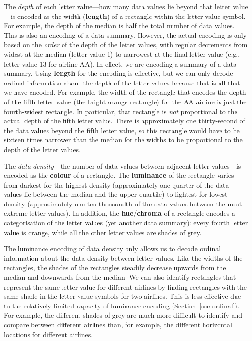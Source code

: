 \documentclass[
  letterpaper,
  DIV=11,
  numbers=noendperiod]{scrreprt}
\begin{document}
The \emph{depth} of each letter value---how many data values lie beyond
that letter value---is encoded as the width (\textbf{length}) of a
rectangle within the letter-value symbol. For example, the depth of the
median is half the total number of data values. This is also an encoding
of a data summary. However, the actual encoding is only based on the
\emph{order} of the depth of the letter values, with regular decrements
from widest at the median (letter value 1) to narrowest at the final
letter value (e.g., letter value 13 for airline AA). In effect, we are
encoding a summary of a data summary. Using \textbf{length} for the
encoding is effective, but we can only decode ordinal information about
the depth of the letter values because that is all that we have encoded.
For example, the width of the rectangle that encodes the depth of the
fifth letter value (the bright orange rectangle) for the AA airline is
just the fourth-widest rectangle. In particular, that rectangle is
\emph{not} proportional to the actual depth of the fifth letter value.
There is approximately one thirty-second of the data values beyond the
fifth letter value, so this rectangle would have to be sixteen times
narrower than the median for the widths to be proportional to the depth
of the letter values.

The \emph{data density}---the number of data values between adjacent
letter values---is encoded as the \textbf{colour} of a rectangle. The
\textbf{luminance} of the rectangle varies from darkest for the highest
density (approximately one quarter of the data values lie between the
median and the upper quartile) to lightest for lowest density
(approximately one ten-thousandth of the data values between the most
extreme letter values). In addition, the \textbf{hue}/\textbf{chroma} of
a rectangle encodes a categorisation of the letter values (yet another
data summary): every fourth letter value is orange, while all the other
letter values are shades of grey.

The luminance encoding of data density only allows us to decode ordinal
information about the data density between letter values. Like the
widths of the rectangles, the shades of the rectangles steadily decrease
upwards from the median and downwards from the median. We can also
identify rectangles that represent the same letter value for different
airlines by finding rectangles with the same shade in the letter-value
symbols for two airlines. This is less effective due to the relatively
limited capacity of luminance encoding (Section~\ref{sec-ordinal}). For
example, the different shades of grey are much more difficult to
identify and compare between different airlines than, for example, the
different horizontal locations for different airlines.
\end{document}
